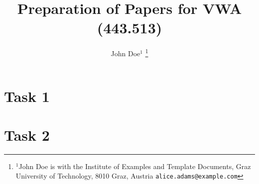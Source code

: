 \documentclass[a4paper, 10 pt, conference]{ieeeconf}
\title{\LARGE \bf
Preparation of Papers for VWA (443.513)
}
\author{John Doe$^{1}$%
\thanks{$^{1}$John Doe is with the Institute of Examples and Template Documents, Graz University of Technology, 8010 Graz, Austria
        {\tt\small alice.adams@example.com}}%
}
\begin{document}


\section{Task 1}
\label{sec:task_1}




\section{Task 2}
\label{sec:task_2}





% 

\addtolength{\textheight}{-12cm}   %
\end{document}
